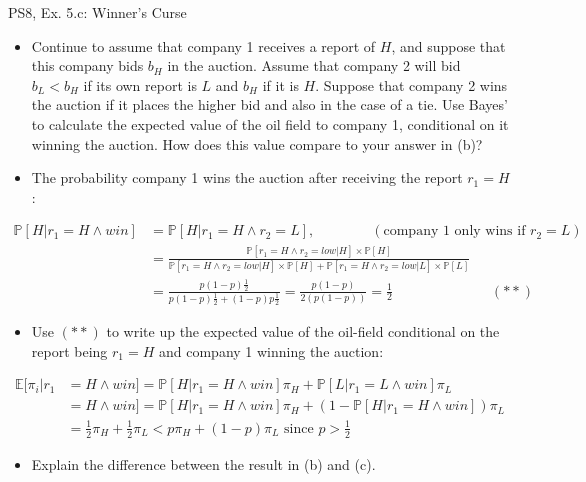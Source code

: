 \begin{frame}{PS8, Ex. 5.c: Winner's Curse}
      \begin{itemize}
        \item[(c)] Continue to assume that company 1 receives a report of $H$, and suppose that this company bids $b_H$ in the auction. Assume that company 2 will bid $b_L < b_H$ if its own report is $L$ and $b_H$ if it is $H$. Suppose that company 2 wins the auction if it places the higher bid and also in the case of a tie. Use Bayes’ to calculate the expected value of the oil field to company 1, conditional on it winning the auction. How does this value compare to your answer in (b)?
        \item[Step 1:] The probability company 1 wins the auction after receiving the report $r_1=H$:
        \end{itemize}
        \vspace{-8pt}
        \begin{align*}
          \mathbb{P}[H|r_1=H\wedge win]&=\mathbb{P}[H|r_1=H\wedge r_2=L],\quad\quad\quad\quad(\text{company 1 only wins if }r_2=L)\\
            &=\frac{\mathbb{P}[r_1=H\wedge r_2=low|H]\times\mathbb{P}[H]}{\mathbb{P}[r_1=H\wedge r_2=low|H]\times\mathbb{P}[H]+\mathbb{P}[r_1=H\wedge r_2=low|L]\times\mathbb{P}[L]}&\\
            &=\frac{p(1-p)\frac{1}{2}}{p(1-p)\frac{1}{2}+(1-p)p\frac{1}{2}}=\frac{p(1-p)}{2(p(1-p))}=\frac{1}{2}\quad\quad\quad\quad\quad\quad\quad(**)
        \end{align*}
        \vspace{-8pt}
        \begin{itemize}
        \item[Step 2:] Use $(**)$ to write up the expected value of the oil-field conditional on the report being $r_1=H$ and company 1 winning the auction:
      \end{itemize}
      \vspace{-4pt}
      \begin{align*}
        \mathbb{E}[\pi_i|r_1&=H\wedge win]=\mathbb{P}[H|r_1=H\wedge win]\pi_H+\mathbb{P}[L|r_1=L\wedge win]\pi_L\\
        &=H\wedge win]=\mathbb{P}[H|r_1=H\wedge win]\pi_H+\left(1-\mathbb{P}[H|r_1=H\wedge win]\right)\pi_L\\
        &=\frac{1}{2}\pi_H+\frac{1}{2}\pi_L<p\pi_H+(1-p)\pi_L\text{   since   }p>\frac{1}{2}
      \end{align*}
      \vspace{-10pt}
      \begin{itemize}
        \item[Step 3:] Explain the difference between the result in (b) and (c).
      \end{itemize}
      \vfill\null
\end{frame}
